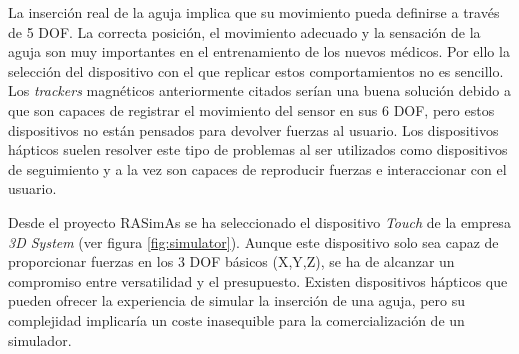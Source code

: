 
La inserción real de la aguja implica que su movimiento pueda definirse a través de 5 \ac{DOF}. La correcta posición, el movimiento adecuado y la sensación de la aguja son muy importantes en el entrenamiento de los nuevos médicos. Por ello la selección del dispositivo con el que replicar estos comportamientos no es sencillo. Los \emph{\acs{tracker}s} magnéticos anteriormente citados serían una buena solución debido a que son capaces de registrar el movimiento del sensor en sus 6 \ac{DOF}, pero estos dispositivos no están pensados para devolver fuerzas al usuario. Los dispositivos hápticos suelen resolver este tipo de problemas al ser utilizados como dispositivos de seguimiento y a la vez son capaces de reproducir fuerzas e interaccionar con el usuario.

Desde el proyecto \ac{RASimAs} se ha seleccionado el dispositivo \emph{Touch} de la empresa \emph{3D System}\cite{touch} (ver figura \ref{fig:simulator}). Aunque este dispositivo solo sea capaz de proporcionar fuerzas en los 3 \ac{DOF} básicos (X,Y,Z), se ha de alcanzar un compromiso entre versatilidad y el presupuesto. Existen dispositivos hápticos que pueden ofrecer la experiencia de simular la inserción de una aguja, pero su complejidad implicaría un coste inasequible para la comercialización de un simulador. %


